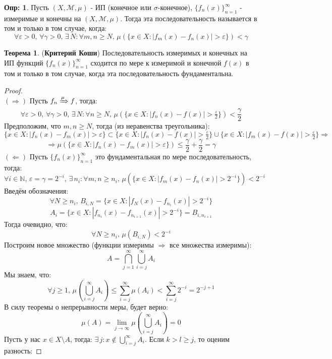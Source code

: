 \documentclass[12pt]{article}
\newcommand{\MN}{\mathbb{N}}
\newcommand{\MM}{\mathcal{M}}
\newcommand{\VE}{\varepsilon}
\theoremstyle{definition}
\newtheorem{defn}{Опр:}
\newtheorem{theorem}{Теорема}
\newcommand{\ddsum}[2]{\displaystyle\sum\limits_{#1}^{#2}}
\begin{document}
\begin{defn}
	Пусть $(X,\MM,\mu)$ - ИП (конечное или $\sigma$-конечное), $\{f_n(x)\}_{n = 1}^{\infty}$ - измеримые и конечны на $(X,\MM,\mu)$. Тогда эта последовательность называется  в том и только в том случае, когда:
	$$
		\forall \VE > 0, \, \forall \gamma > 0, \, \exists \, N \colon \forall m,n \geq N, \, \mu(\{x \in X \colon |f_m(x) - f_n(x)| > \VE \}) < \gamma
	$$
\end{defn}
\begin{theorem}(\textbf{Критерий Коши})
	Последовательность измеримых и конечных на ИП функций $\{f_n(x)\}_{n = 1}^{\infty}$ сходится по мере к измеримой и конечной $f(x)$ в том и только в том случае, когда эта последовательность фундаментальна.
\end{theorem}
\begin{proof}\hfill\\
	$(\Rightarrow)$ Пусть $f_n \xRightarrow{\mu} f$, тогда:
	$$
		\forall \VE > 0, \, \forall \gamma > 0, \, \exists \, N \colon \forall n \geq N, \, \mu(\{x \in X \colon |f_n(x) - f(x)| > \tfrac{\VE}{2}\}) < \dfrac{\gamma}{2}
	$$
	Предположим, что $m,n \geq N$, тогда (из неравенства треугольника):
	$$
		\{x \in X \colon |f_n(x) - f_m(x)| > \VE\} \subset \{x \in X \colon |f_n(x) - f(x)| > \tfrac{\VE}{2}\} \cup \{x \in X \colon |f_m(x) - f(x)| > \tfrac{\VE}{2}\} \Rightarrow 
	$$
	$$
		\Rightarrow \mu(\{x \in X \colon |f_n(x) - f_m(x)| > \VE\})\leq \dfrac{\gamma}{2} + \dfrac{\gamma}{2} = \gamma
	$$
	$(\Leftarrow)$ Пусть $\{f_n(x)\}_{n = 1}^{\infty}$ это фундаментальная по мере последовательность, тогда:
	$$
		\forall i \in \MN, \, \VE = \gamma = 2^{-i}, \, \exists \, n_i \colon \forall m,n \geq n_i, \, \mu(\{x \in X \colon |f_m(x) -f_n(x)| > 2^{-i} \}) < 2^{-i}
	$$
	Введём обозначения: 
	$$
		\forall N \geq n_i, \, B_{i,N} = \{x \in X \colon |f_N(x) - f_{n_i}(x)| > 2^{-i}\}
	$$
	$$
		A_i = \{x \in X \colon |f_{n_i}(x) - f_{n_{i+1}}(x)| > 2^{-i}\} = B_{i , n_{i+1}}
	$$
	Тогда очевидно, что: 
	$$
		\forall N \geq n_i, \, \mu(B_{i,N}) < 2^{-i}
	$$
	Построим новое множество (функции измеримы $\Rightarrow$ все множества измеримы): 
	$$
		A = \bigcap\limits_{j = 1}^{\infty}\bigcup\limits_{i = j}^{\infty}A_i
	$$ 
	Мы знаем, что:
	$$
		\forall j \geq 1, \, \mu\left(\bigcup\limits_{i = j}^{\infty}A_i \right) \leq \ddsum{i = j}{\infty}\mu(A_i) < \ddsum{i = j}{\infty}2^{-i} = 2^{-j + 1}
	$$
	В силу теоремы о непрерывности меры, будет верно:
	$$
		\mu(A) = \lim\limits_{j \to \infty} \mu\left(\bigcup\limits_{i = j}^{\infty}A_i \right) = 0
	$$
	Пусть у нас $x \in X \setminus A$, тогда: $\exists \, j \colon x \not\in \bigcup\limits_{i = j}^{\infty}A_i$. Если $k > l \geq j$, то оценим разность:

\end{proof}
\end{document}
